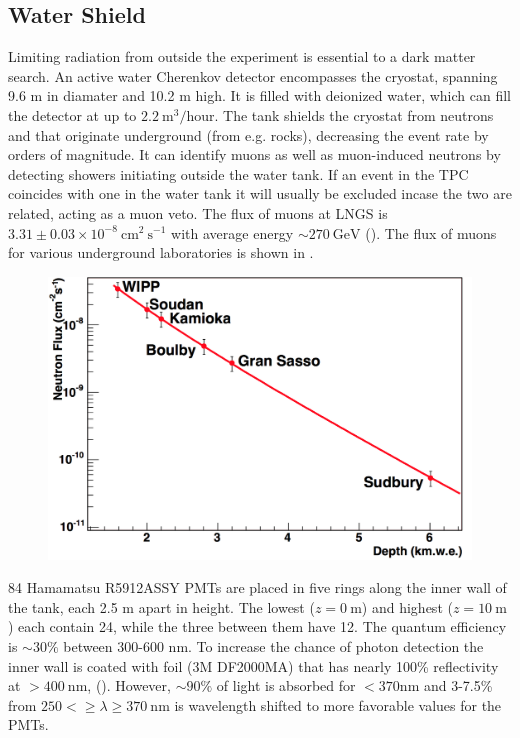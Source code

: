\subsection{Water Shield}
\label{subsec:xenon1t_water_shield}
Limiting radiation from outside the experiment is essential to a dark matter search.  An active water Cherenkov detector encompasses the
cryostat, spanning 9.6 m in diamater and 10.2 m high.  It is filled with deionized water, which can fill the detector at up to
$2.2\ \mathrm{m^{3}/hour}$.  The tank shields the cryostat from neutrons and \gammarays that originate underground (from e.g. rocks),
decreasing the event rate by orders of magnitude.  It can identify muons as well as muon-induced neutrons by detecting showers initiating
outside the water tank.  If an event in the TPC coincides with one in the water tank it will usually be excluded incase the two are
related, acting as a muon veto.  The flux of muons at LNGS is $3.31 \pm 0.03 \times 10^{-8}\ \mathrm{cm^2\ s^{-1}}$ with average energy
${\sim}270\ \mathrm{GeV}$ ().  The flux of muons for various underground laboratories is shown in
.

\begin{figure}
\centering
\includegraphics[with=0.8\textwidth]{MuonFluxOverDepth}
\label{fig:xenon1t_water_shield_flux}
\end{figure}

84 Hamamatsu R5912ASSY PMTs are placed in five rings along the inner wall of the tank, each 2.5 m apart in height.  The lowest
($z = 0\ \mathrm{m}$) and highest ($z = 10\ \mathrm{m}$) each contain 24, while the three between them have 12.  The quantum efficiency
is ${\sim}30\%$ between 300-600 nm.  To increase the chance of photon detection the inner wall is coated with foil (3M DF2000MA) that has
nearly 100\% reflectivity at $> 400\ \mathrm{nm}$, ().  However, ${\sim}90\%$ of light is absorbed for $<370 \mathrm{nm}$
and 3-7.5\% from $250 < \geq \lambda \geq 370\ \mathrm{nm}$ is wavelength shifted to more favorable values for the PMTs.

